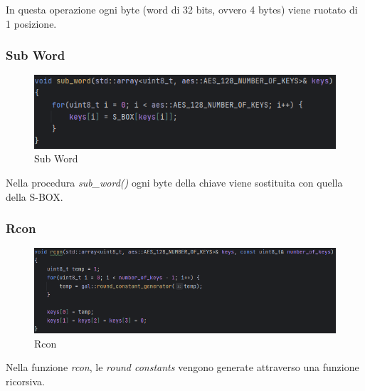 \textsf{\small In questa operazione ogni byte (word di 32 bits, ovvero 4 bytes) viene ruotato di 1 posizione.} %

\subsubsection{Sub Word}


\begin{figure}[H]
	\centering
	\includegraphics[width=1\textwidth, height=1\textheight, keepaspectratio]{./images/code/cpp/key_expansion/sub_word.PNG}
	\caption{Sub Word}
	\label{fig:sub_word}
\end{figure}

 

\textsf{\small Nella procedura \emph{sub\_word()} ogni byte della chiave viene sostituita con quella della S-BOX.}

\subsubsection{Rcon}


\begin{figure}[H]
	\centering
	\includegraphics[width=1\textwidth, height=1\textheight, keepaspectratio]{./images/code/cpp/key_expansion/rcon.PNG}
	\caption{Rcon}
	\label{fig:rcon}
\end{figure}

 

\textsf{\small Nella funzione \emph{rcon}, le \emph{round constants} vengono generate attraverso una funzione ricorsiva.}

